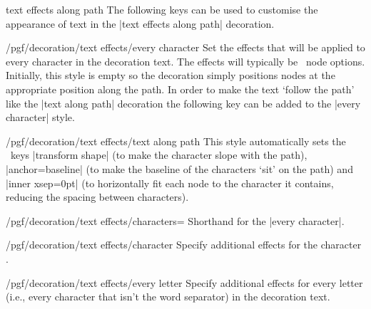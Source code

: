 \begin{decoration}{text effects along path}
    The following keys can be used to customise the
    appearance of text in the |text effects along path|
    decoration.

    \begin{stylekey}{/pgf/decoration/text effects/every character}
        Set the effects that will be applied to every character in the
        decoration text. The effects will typically be \tikzname\ node options.
        Initially, this style is empty so the decoration simply positions nodes
        at the appropriate position along the path. In order to make the text
        `follow the path' like the |text along path| decoration the following
        key can be added to the |every character| style.
    \end{stylekey}

    \begin{stylekey}{/pgf/decoration/text effects/text along path}
        This style automatically sets the \tikzname\ keys |transform shape| (to
        make the character slope with the path), |anchor=baseline| (to make the
        baseline of the characters `sit' on the path) and |inner xsep=0pt| (to
        horizontally fit each node to the character it contains, reducing the
        spacing between characters).
\begin{codeexample}[preamble={\usetikzlibrary{decorations.text}}]
\end{codeexample}
    \end{stylekey}

    \begin{key}{/pgf/decoration/text effects/characters=}
        Shorthand for the |every character|.
    \end{key}

    \begin{stylekey}{/pgf/decoration/text effects/character }
        Specify additional effects for the character .
    \end{stylekey}

    \begin{stylekey}{/pgf/decoration/text effects/every letter}
        Specify additional effects for every letter (i.e., every character that
        isn't the word separator) in the decoration text.
    \end{stylekey}


\end{decoration}
